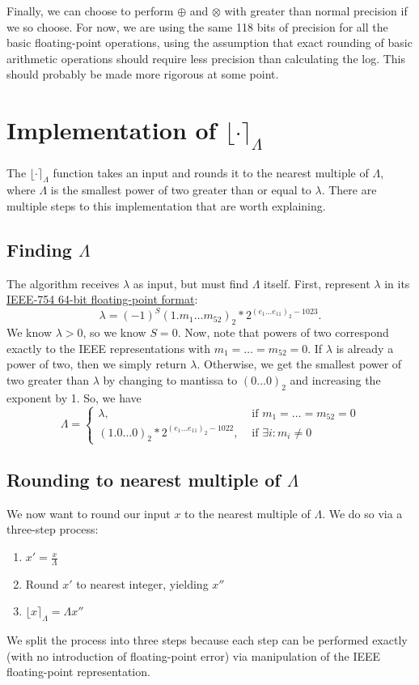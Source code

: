 \documentclass[11pt]{scrartcl} %
\begin{document}
Finally, we can choose to perform $\oplus$ and $\otimes$ with greater than normal precision if we so choose. For now, we are using the same 118 bits of precision for all the basic floating-point operations, using the assumption that exact rounding of basic arithmetic operations should require less precision than calculating the log. This should probably be made more rigorous at some point.

\section{Implementation of $\lfloor \cdot \rceil_{\Lambda}$}
The $\lfloor \cdot \rceil_{\Lambda}$ function takes an input and rounds it to the nearest multiple of $\Lambda$, where $\Lambda$ is the smallest power of two greater than or equal to $\lambda$. There are multiple steps to this implementation that are worth explaining.

\subsection{Finding $\Lambda$}
The algorithm receives $\lambda$ as input, but must find $\Lambda$ itself. First, represent $\lambda$ in its \href{https://en.wikipedia.org/wiki/Double-precision_floating-point_format}{IEEE-754 64-bit floating-point format}:
\[ \lambda = (-1)^S (1.m_{1} \hdots m_{52})_2 * 2^{(e_1 \hdots e_{11})_2-1023}. \]
We know $\lambda > 0$, so we know $S = 0$. Now, note that powers of two correspond exactly to the IEEE representations with $m_1 = \hdots = m_{52} = 0$. If $\lambda$ is already a power of two, then we simply return $\lambda$. Otherwise, we get the smallest power of two greater than $\lambda$ by changing to mantissa to $(0 \hdots 0)_2$ and increasing the exponent by 1. So, we have
\begin{equation}
    \Lambda =
        \begin{cases}
            \lambda, & \text{ if } m_1 = \hdots = m_{52} = 0 \\
            (1.0 \hdots 0)_2 * 2^{(e_1 \hdots e_{11})_2-1022}, & \text{ if } \exists i: m_i \neq 0
        \end{cases}
\end{equation}

\subsection{Rounding to nearest multiple of $\Lambda$}
We now want to round our input $x$ to the nearest multiple of $\Lambda$. We do so via a three-step process:
\begin{enumerate}
    \item $x' = \frac{x}{\Lambda}$
    \item Round $x'$ to nearest integer, yielding $x''$
    \item $\lfloor x \rceil_{\Lambda} = \Lambda x''$
\end{enumerate}
We split the process into three steps because each step can be performed exactly (with no introduction of floating-point error) via manipulation of the IEEE floating-point representation.
\end{document}
